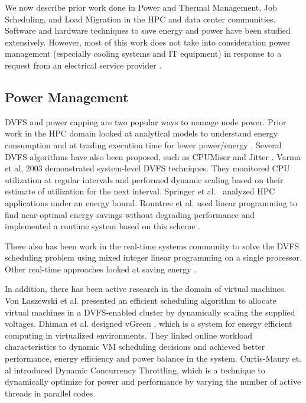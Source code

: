 We now describe prior work done in Power and Thermal Management, Job Scheduling, and Load Migration in the HPC and data center communities. Software and hardware techniques to save energy and power have been studied extensively. However, most of this work does not take into consideration power management (especially cooling systems and IT equipment) in response to a request from an electrical service provider \cite{Ghatikar2012a}. 

\subsection{Power Management}
DVFS and power capping are two popular ways to manage node power. Prior work in the HPC domain looked at analytical models to understand energy consumption \cite{SpringerPPoPP2006,GeICPP2007,LiHPCA2006} and at trading execution time for lower power/energy \cite{CameronSC2005,HsuSC2005}. Several DVFS algorithms have also been proposed, such as CPUMiser \cite{GeICPP2007} and Jitter \cite{KappiahSC2005}. Varma et al, 2003 \cite{varma_control-theoretic_2003} demonstrated system-level DVFS techniques. They monitored CPU utilization at regular intervals and performed dynamic scaling based on their estimate of utilization for the next interval. Springer et al.~\cite{springer:06} analyzed HPC applications under an energy bound. Rountree et al. used linear programming to find near-optimal energy savings without degrading performance \cite{rountree:07} and implemented a runtime system based on this scheme \cite{rountree:09}. 

There also has been work in the real-time systems community to solve the DVFS scheduling problem using mixed integer linear programming on a single processor\cite{IshiharaISLPED1998,SaputraLCTES2002,SwaminathanRTSS2000,SwaminathanASPDAC2001}. Other real-time approaches looked at saving energy \cite{MoncusiRTSS2003,MochockiICCAD2002,MochockiRTAS2005,ZhuTPDS2003,ZhangDAC2002}. 

In addition, there has been active research in the domain of virtual machines. Von Laszewski et al. \cite{von_laszewski_power-aware_2009} presented an efficient scheduling algorithm to allocate virtual machines in a DVFS-enabled cluster by dynamically scaling the supplied voltages. Dhiman et al. designed vGreen \cite{dhiman_vgreen:_2009}, which is a system for energy efficient computing in 
virtualized environments. They linked online workload characteristics to dynamic VM scheduling decisions and achieved better performance, energy
efficiency and power balance in the system. Curtis-Maury et. al \cite{Curtis1,Curtis2,Curtis3} introduced Dynamic Concurrency Throttling, which is a technique to dynamically optimize for power and performance by varying the number of active threads in parallel codes. 

